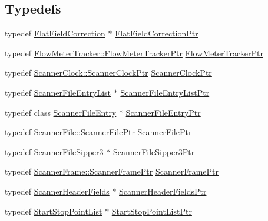 \subsection*{Typedefs}
\begin{DoxyCompactItemize}
\item 
typedef \hyperlink{class_k_k_l_s_c_1_1_flat_field_correction}{Flat\+Field\+Correction} $\ast$ \hyperlink{namespace_k_k_l_s_c_a88efa04aa3b2fed1f7644ad1cc352233}{Flat\+Field\+Correction\+Ptr}
\item 
typedef \hyperlink{class_k_k_l_s_c_1_1_flow_meter_tracker_a3e157d685c7b8d014283b6aac91c9e13}{Flow\+Meter\+Tracker\+::\+Flow\+Meter\+Tracker\+Ptr} \hyperlink{namespace_k_k_l_s_c_afcd320057dff4ae7ce3fac260af044b9}{Flow\+Meter\+Tracker\+Ptr}
\item 
typedef \hyperlink{class_k_k_l_s_c_1_1_scanner_clock_ae9f5ad56e5e47142e6759e406c55a9ea}{Scanner\+Clock\+::\+Scanner\+Clock\+Ptr} \hyperlink{namespace_k_k_l_s_c_ac5802f7c76843b22e86cabe21b6500e5}{Scanner\+Clock\+Ptr}
\item 
typedef \hyperlink{class_k_k_l_s_c_1_1_scanner_file_entry_list}{Scanner\+File\+Entry\+List} $\ast$ \hyperlink{namespace_k_k_l_s_c_ab51c44a94fde307d25c3f0cc93c6bf64}{Scanner\+File\+Entry\+List\+Ptr}
\item 
typedef class \hyperlink{class_k_k_l_s_c_1_1_scanner_file_entry}{Scanner\+File\+Entry} $\ast$ \hyperlink{namespace_k_k_l_s_c_a54ff7eab3cb7195f02302b70282bfa8d}{Scanner\+File\+Entry\+Ptr}
\item 
typedef \hyperlink{class_k_k_l_s_c_1_1_scanner_file_a4ce197a15dc3da96b2258d55f383db2d}{Scanner\+File\+::\+Scanner\+File\+Ptr} \hyperlink{namespace_k_k_l_s_c_ad33f47f76479d7fb0fc90d06fa34b581}{Scanner\+File\+Ptr}
\item 
typedef \hyperlink{class_k_k_l_s_c_1_1_scanner_file_sipper3}{Scanner\+File\+Sipper3} $\ast$ \hyperlink{namespace_k_k_l_s_c_a1439b1f1a105caf8a8224c155d0e269e}{Scanner\+File\+Sipper3\+Ptr}
\item 
typedef \hyperlink{class_k_k_l_s_c_1_1_scanner_frame_a1f74e8ccdefff626991fd1d68ff00362}{Scanner\+Frame\+::\+Scanner\+Frame\+Ptr} \hyperlink{namespace_k_k_l_s_c_a5f25f724bd4774df2a6a8868024b233b}{Scanner\+Frame\+Ptr}
\item 
typedef \hyperlink{class_k_k_l_s_c_1_1_scanner_header_fields}{Scanner\+Header\+Fields} $\ast$ \hyperlink{namespace_k_k_l_s_c_a7c06efc9062d7120e1fbf26f44ce4089}{Scanner\+Header\+Fields\+Ptr}
\item 
typedef \hyperlink{class_k_k_l_s_c_1_1_start_stop_point_list}{Start\+Stop\+Point\+List} $\ast$ \hyperlink{namespace_k_k_l_s_c_adbe6cf94c19379a2ceb7a9f6d6188702}{Start\+Stop\+Point\+List\+Ptr}

\end{DoxyCompactItemize}
